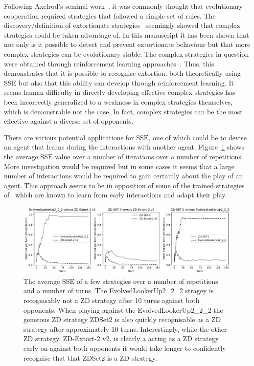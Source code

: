\documentclass[a4paper]{article}
\newcommand{\SSe}{\text{SSE}}
\begin{document}
Following Axelrod's seminal work~\cite{Axelrod1980, Axelrod1980a}, it was
commonly thought that evolutionary cooperation required strategies that followed
a simple set of rules. The discovery/definition of extortionate
strategies~\cite{Press2012} seemingly showed that complex strategies could be
taken advantage of. In this manuscript it has been shown that not only is it
possible to detect and prevent extortionate behaviour but that more complex
strategies can be evolutionary stable. The complex strategies in question were
obtained through reinforcement learning approaches~\cite{Harper2017, Moran1707}.
Thus, this demonstrates that it is possible to recognise extortion, both
theoretically using \(\SSe\) but also that this ability can develop through
reinforcement learning. It seems human difficulty in directly developing
effective complex strategies has been incorrectly generalized to a weakness
in complex strategies themselves, which is demonstrable not the case. In fact,
complex strategies can be the most effective against a diverse set of opponents.

There are various potential applications for \(\SSe\), one of which could be to
devise an agent that learns during the interactions with another agent.
Figure~\ref{fig:learning_sse} shows the average \(\SSe\) value over a number of
iterations over a number of repetitions. More investigation would be required
but in some cases it seems that a large number of interactions would be required
to gain certainly about the play of an agent. This approach seems to be in
opposition of some of the trained
strategies of~\cite{Harper2017} which are known to learn from early interactions
and adapt their play. 

\begin{figure}[!htbp]
    \centering
    \includegraphics[width=.8\textwidth]{./assets/img/learning_sse/main.pdf}
    \caption{The average \(\SSe\) of a few strategies over a number of
    repetitions and a number of turns. The EvolvedLookerUp2\_2\_2 stragey is
    recognisably not a ZD strategy after 10 turns against both opponents.  When
    playing against the EvolvedLookerUp2\_2\_2 the generous ZD strategy ZDSet2
    is also quickly recognisable as a ZD strategy after approximately 10 turns.
    Interestingly, while the other ZD strategy, ZD-Extort-2 v2, is clearly a
    acting as a ZD strategy early on against both opponents it would take longer
    to confidently recognise that that ZDSet2 is a ZD strategy.
        }
    \label{fig:learning_sse}
\end{figure}
\end{document}
